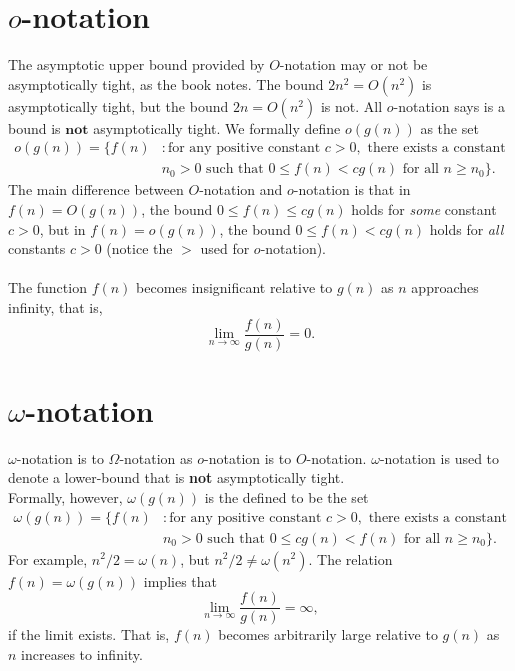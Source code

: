 \documentclass{article}
\begin{document}
\newpage

\section*{$o$-notation}
The asymptotic upper bound provided by $O$-notation may or not be asymptotically tight, as the book notes. The bound $2n^2=O(n^2)$ is asymptotically tight, but the bound $2n=O(n^2)$ is not. All $o$-notation says is a bound is $\textbf{not}$ asymptotically tight.\newline
We formally define $o(g(n))$ as the set
\begin{equation*}
\begin{split}
o{(g(n))} = \{f(n) & : \text{for any positive constant } c > 0,\text{ there exists a constant}\\
  & n_0 > 0 \text{ such that } 0 \leq f(n) < cg(n) \text{ for all } n \geq n_0\}.
\end{split}
\end{equation*}
The main difference between $O$-notation and $o$-notation is that in $f(n)=O(g(n))$, the bound $0 \leq f(n) \leq cg(n)$ holds for \textit{some} constant $c > 0$, but in $f(n)=o(g(n))$, the bound $0 \leq f(n) < cg(n)$ holds for \textit{all} constants $c > 0$ (notice the $>$ used for $o$-notation).
\\ \\
The function $f(n)$ becomes insignificant relative to $g(n)$ as $n$ approaches infinity, that is,
\newline
$$\lim_{n\to\infty} \frac{f(n)}{g(n)} = 0.$$

\section*{$\omega$-notation}
$\omega$-notation is to $\Omega$-notation as $o$-notation is to $O$-notation. $\omega$-notation is used to denote a lower-bound that is \textbf{not} asymptotically tight.\\
Formally, however, $\omega(g(n))$ is the defined to be the set\newline
\begin{equation*}
\begin{split}
\omega{(g(n))} = \{f(n) & : \text{for any positive constant } c > 0,\text{ there exists a constant}\\
  & n_0 > 0 \text{ such that } 0 \leq cg(n) < f(n) \text{ for all } n \geq n_0\}.
\end{split}
\end{equation*}
For example, $n^2/2 = \omega{(n)}$, but $n^2/2 \neq \omega{(n^2)}$. The relation $f(n) = \omega{(g(n))}$ implies that\newline
$$\lim_{n\to\infty} \frac{f(n)}{g(n)} = \infty,$$
if the limit exists. That is, $f(n)$ becomes arbitrarily large relative to $g(n)$ as $n$ increases to infinity.
\end{document}
